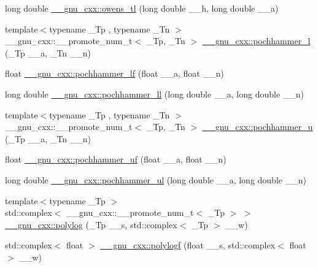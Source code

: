 \begin{DoxyCompactItemize}
long double \hyperlink{group__gnu__math__spec__func_ga7a8bc60dc0ef4a009586872eb7cac2d0}{\+\_\+\+\_\+gnu\+\_\+cxx\+::owens\+\_\+tl} (long double \+\_\+\+\_\+h, long double \+\_\+\+\_\+a)
\item 
{\footnotesize template$<$typename \+\_\+\+Tp , typename \+\_\+\+Tn $>$ }\\\+\_\+\+\_\+gnu\+\_\+cxx\+::\+\_\+\+\_\+promote\+\_\+num\+\_\+t$<$ \+\_\+\+Tp, \+\_\+\+Tn $>$ \hyperlink{group__gnu__math__spec__func_gafed029416c3c440fea35a3a135991436}{\+\_\+\+\_\+gnu\+\_\+cxx\+::pochhammer\+\_\+l} (\+\_\+\+Tp \+\_\+\+\_\+a, \+\_\+\+Tn \+\_\+\+\_\+n)
\item 
float \hyperlink{group__gnu__math__spec__func_ga66c7ea176dad7f06f19cc80e860f333c}{\+\_\+\+\_\+gnu\+\_\+cxx\+::pochhammer\+\_\+lf} (float \+\_\+\+\_\+a, float \+\_\+\+\_\+n)
\item 
long double \hyperlink{group__gnu__math__spec__func_gadec5630d81fc1d3f6f61146a2d16fafc}{\+\_\+\+\_\+gnu\+\_\+cxx\+::pochhammer\+\_\+ll} (long double \+\_\+\+\_\+a, long double \+\_\+\+\_\+n)
\item 
{\footnotesize template$<$typename \+\_\+\+Tp , typename \+\_\+\+Tn $>$ }\\\+\_\+\+\_\+gnu\+\_\+cxx\+::\+\_\+\+\_\+promote\+\_\+num\+\_\+t$<$ \+\_\+\+Tp, \+\_\+\+Tn $>$ \hyperlink{group__gnu__math__spec__func_ga4cadb141501737e85c8d6511fe3d3b94}{\+\_\+\+\_\+gnu\+\_\+cxx\+::pochhammer\+\_\+u} (\+\_\+\+Tp \+\_\+\+\_\+a, \+\_\+\+Tn \+\_\+\+\_\+n)
\item 
float \hyperlink{group__gnu__math__spec__func_ga520a93cbd1963b22679e865f29f36331}{\+\_\+\+\_\+gnu\+\_\+cxx\+::pochhammer\+\_\+uf} (float \+\_\+\+\_\+a, float \+\_\+\+\_\+n)
\item 
long double \hyperlink{group__gnu__math__spec__func_ga169c9e8f9d84e51187a0fe4ecaba0947}{\+\_\+\+\_\+gnu\+\_\+cxx\+::pochhammer\+\_\+ul} (long double \+\_\+\+\_\+a, long double \+\_\+\+\_\+n)
\item 
{\footnotesize template$<$typename \+\_\+\+Tp $>$ }\\std\+::complex$<$ \+\_\+\+\_\+gnu\+\_\+cxx\+::\+\_\+\+\_\+promote\+\_\+num\+\_\+t$<$ \+\_\+\+Tp $>$ $>$ \hyperlink{group__gnu__math__spec__func_gafbe8ee0e3edd53cd5cd421e9b913f6b9}{\+\_\+\+\_\+gnu\+\_\+cxx\+::polylog} (\+\_\+\+Tp \+\_\+\+\_\+s, std\+::complex$<$ \+\_\+\+Tp $>$ \+\_\+\+\_\+w)
\item 
std\+::complex$<$ float $>$ \hyperlink{group__gnu__math__spec__func_ga5376edb72358b777035a78b929deb49f}{\+\_\+\+\_\+gnu\+\_\+cxx\+::polylogf} (float \+\_\+\+\_\+s, std\+::complex$<$ float $>$ \+\_\+\+\_\+w)

\end{DoxyCompactItemize}
